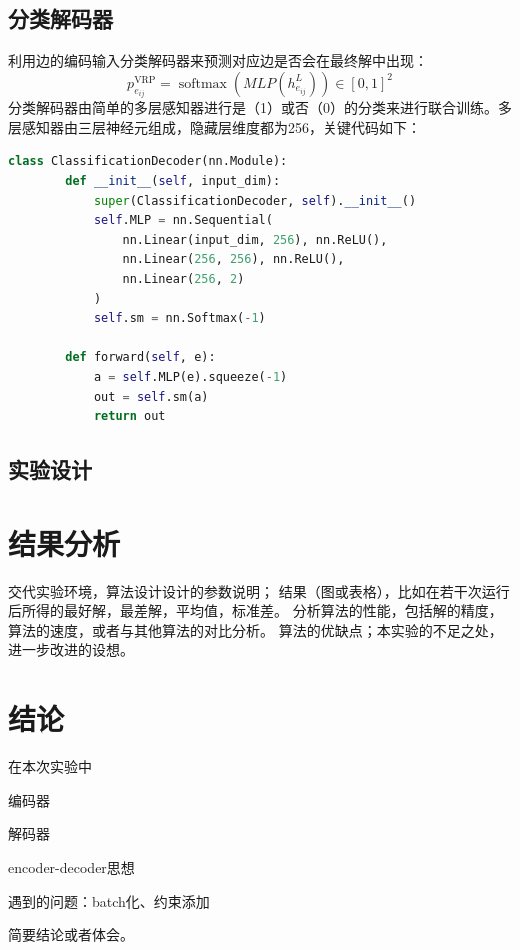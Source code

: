 \documentclass[withoutpreface,bwprint]{cumcmthesis} %
\begin{document}
\subsection{分类解码器}
	利用边的编码输入分类解码器来预测对应边是否会在最终解中出现：
	$$
	p_{e_{i j}}^{\mathrm{VRP}}=\operatorname{softmax}\left(M L P\left(h_{e_{i j}}^{L}\right)\right) \in[0,1]^{2}
	$$
	分类解码器由简单的多层感知器进行是（1）或否（0）的分类来进行联合训练。多层感知器由三层神经元组成，隐藏层维度都为256，关键代码如下：
\begin{lstlisting}[language=python]
	class ClassificationDecoder(nn.Module):
	    def __init__(self, input_dim):
	        super(ClassificationDecoder, self).__init__()
	        self.MLP = nn.Sequential(
	            nn.Linear(input_dim, 256), nn.ReLU(),
	            nn.Linear(256, 256), nn.ReLU(),
	            nn.Linear(256, 2)
	        )
	        self.sm = nn.Softmax(-1)
	
	    def forward(self, e):
	        a = self.MLP(e).squeeze(-1)
	        out = self.sm(a)
	        return out
\end{lstlisting}

\subsection{实验设计}

\section{结果分析}
	
   交代实验环境，算法设计设计的参数说明；
   结果（图或表格），比如在若干次运行后所得的最好解，最差解，平均值，标准差。
   分析算法的性能，包括解的精度，算法的速度，或者与其他算法的对比分析。
   算法的优缺点；本实验的不足之处，进一步改进的设想。
\section{结论}
	在本次实验中
	
	编码器
	
	解码器
	
	encoder-decoder思想
	
	遇到的问题：batch化、约束添加 %
	
   简要结论或者体会。
\end{document}
